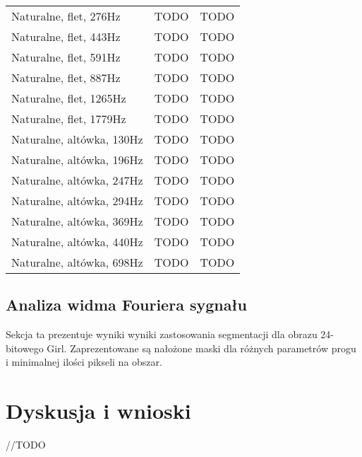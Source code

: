 \documentclass{classrep}
\begin{document}
\begin{tabular}{ l | c | c }
  Naturalne, flet, 276Hz & TODO & TODO \\
  Naturalne, flet, 443Hz & TODO & TODO \\
  Naturalne, flet, 591Hz & TODO & TODO \\
  Naturalne, flet, 887Hz & TODO & TODO \\
  Naturalne, flet, 1265Hz & TODO & TODO \\
  Naturalne, flet, 1779Hz & TODO & TODO \\
  \hline 
  Naturalne, altówka, 130Hz & TODO & TODO \\
  Naturalne, altówka, 196Hz & TODO & TODO \\
  Naturalne, altówka, 247Hz & TODO & TODO \\
  Naturalne, altówka, 294Hz & TODO & TODO \\
  Naturalne, altówka, 369Hz & TODO & TODO \\
  Naturalne, altówka, 440Hz & TODO & TODO \\
  Naturalne, altówka, 698Hz & TODO & TODO \\
  \hline 
\end{tabular}

\subsection{Analiza widma Fouriera sygnału}
Sekcja ta prezentuje wyniki wyniki zastosowania segmentacji dla obrazu 24-bitowego Girl. Zaprezentowane są nałożone maski dla różnych parametrów progu i minimalnej ilości pikseli na obszar.

\section{Dyskusja i wnioski}
//TODO

\begin{thebibliography}{1}
\\
\\
\end{thebibliography}
\end{document}

